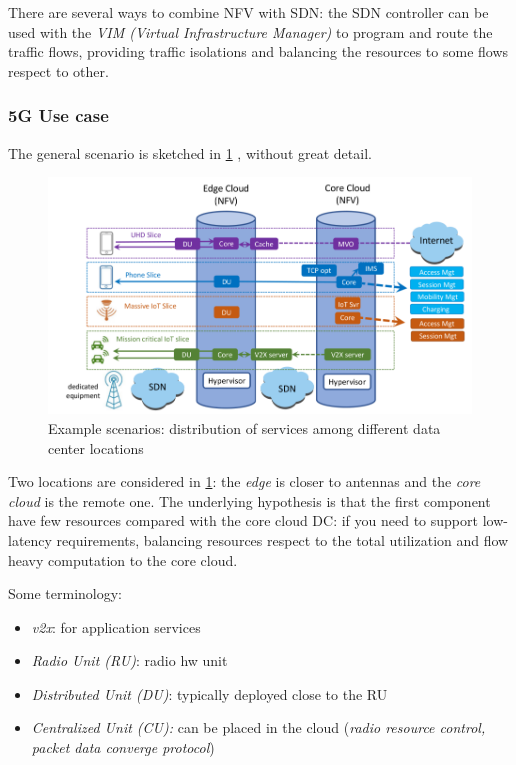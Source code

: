 \documentclass[10pt,a4paper]{report}
\theoremstyle{definition}
\begin{document}
There are several ways to combine NFV with SDN: the SDN controller can be used with the \textit{VIM (Virtual Infrastructure Manager)} to program and route the traffic flows, providing traffic isolations and balancing the resources to some flows respect to other.
\subsubsection{5G Use case}\label{sec:5g-use-case}
The general scenario is sketched in \ref{slicing-overall-components} , without great detail.
\begin{figure}[h]
	\centering\includegraphics[scale=0.40]{images/Pasted image 20230420122014.png}
	\caption{Example scenarios: distribution of services among different data center locations}
	\label{slicing-overall-components}

\end{figure}


Two locations are considered in \ref{slicing-overall-components}: the \textit{edge} is closer to antennas and the \textit{core cloud} is the remote one. The underlying hypothesis is that the first component have few resources compared with the core cloud DC: if you need to support low-latency requirements, balancing resources respect to the total utilization and flow heavy computation to the core cloud.

Some terminology:
\begin{itemize}
	\item \textit{v2x}: for application services
	\item \textit{Radio Unit (RU)}: radio hw unit
	\item \textit{Distributed Unit (DU)}: typically deployed close to the RU
	\item \textit{Centralized Unit (CU):} can be placed in the cloud (\textit{radio resource control, packet data converge protocol})
\end{itemize}
\end{document}
